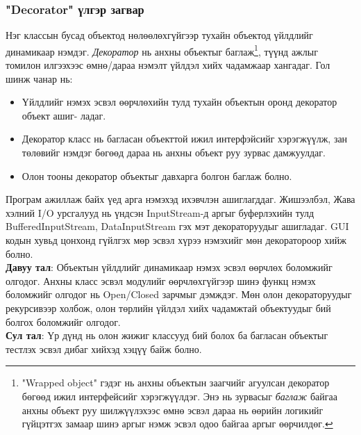 \subsubsection{"Decorator" үлгэр загвар}
\quad \quad Нэг классын бусад объектод нөлөөлөхгүйгээр тухайн объектод үйлдлийг динамикаар нэмдэг. \textit{Декоратор} нь анхны объектыг баглаж\footnote{"Wrapped object" гэдэг нь анхны объектын заагчийг агуулсан декоратор бөгөөд ижил интерфейсийг хэрэгжүүлдэг. Энэ нь зурвасыг \textit{баглаж} байгаа анхны объект руу шилжүүлэхээс өмнө эсвэл дараа нь өөрийн логикийг гүйцэтгэх замаар шинэ аргыг нэмж эсвэл одоо байгаа аргыг өөрчилдөг.}, түүнд ажлыг томилон илгээхээс өмнө/дараа нэмэлт үйлдэл хийх чадамжаар хангадаг. Гол шинж чанар нь:
\begin{itemize}
	\item Үйлдлийг нэмэх эсвэл өөрчлөхийн тулд тухайн объектын оронд декоратор объект ашиг- ладаг. 
	\item Декоратор класс нь багласан объекттой ижил интерфэйсийг хэрэгжүүлж, зан төлөвийг нэмдэг бөгөөд дараа нь анхны объект руу зурвас дамжуулдаг.
	\item Олон тооны декоратор объектыг давхарга болгон баглаж болно.
\end{itemize}
Програм ажиллаж байх үед арга нэмэхэд ихэвчлэн ашиглагддаг. Жишээлбэл, Жава хэлний I/O урсгалууд нь үндсэн InputStream-д аргыг буферлэхийн тулд BufferedInputStream, DataInputStream гэх мэт декораторуудыг ашигладаг. GUI кодын хувьд цонхонд гүйлгэх мөр эсвэл хүрээ нэмэхийг мөн декоратороор хийж болно.\\
\textbf{Давуу тал}: Объектын үйлдлийг динамикаар нэмэх эсвэл өөрчлөх боломжийг олгодог. Анхны класс эсвэл модулийг өөрчлөхгүйгээр шинэ функц нэмэх боломжийг олгодог нь Open/Closed зарчмыг дэмждэг. Мөн олон декораторуудыг рекурсивээр холбож, олон төрлийн үйлдэл хийх чадамжтай объектуудыг бий болгох боломжийг олгодог.\\
\textbf{Сул тал}: Үр дүнд нь олон жижиг классууд бий болох ба багласан объектыг тестлэх эсвэл дибаг хийхэд хэцүү байж болно.
